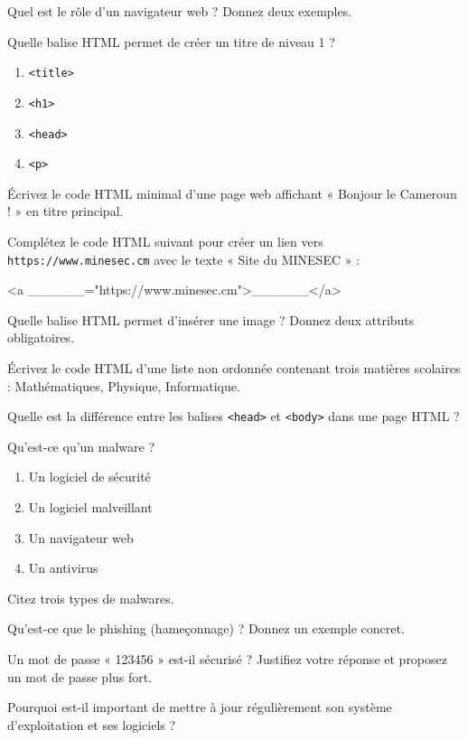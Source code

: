 \exo{}
Quel est le rôle d'un navigateur web ? Donnez deux exemples.


\exo{}
Quelle balise HTML permet de créer un titre de niveau 1 ?
\begin{enumerate}
    \item \texttt{<title>}
    \item \texttt{<h1>}
    \item \texttt{<head>}
    \item \texttt{<p>}
\end{enumerate}

\exo{}
Écrivez le code HTML minimal d'une page web affichant « Bonjour le Cameroun ! » en titre principal.

\exo{}
Complétez le code HTML suivant pour créer un lien vers \texttt{https://www.minesec.cm} avec le texte « Site du MINESEC » :
\begin{ccode}
<a ______="https://www.minesec.cm">______</a>
\end{ccode}

\exo{}
Quelle balise HTML permet d'insérer une image ? Donnez deux attributs obligatoires.

\exo{}
Écrivez le code HTML d'une liste non ordonnée contenant trois matières scolaires : Mathématiques, Physique, Informatique.

\exo{}
Quelle est la différence entre les balises \texttt{<head>} et \texttt{<body>} dans une page HTML ?


\exo{}
Qu'est-ce qu'un malware ?
\begin{enumerate}
    \item Un logiciel de sécurité
    \item Un logiciel malveillant
    \item Un navigateur web
    \item Un antivirus
\end{enumerate}

\exo{}
Citez trois types de malwares.

\exo{}
Qu'est-ce que le phishing (hameçonnage) ? Donnez un exemple concret.

\exo{}
Un mot de passe « 123456 » est-il sécurisé ? Justifiez votre réponse et proposez un mot de passe plus fort.

\exo{}
Pourquoi est-il important de mettre à jour régulièrement son système d'exploitation et ses logiciels ?

